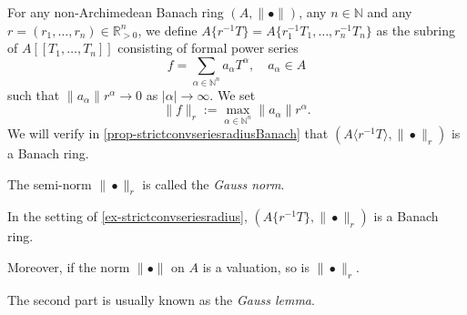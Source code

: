 \begin{example}\label{ex-strictconvseriesradius}
    For any non-Archimedean Banach ring $(A,\|\bullet\|)$, any $n\in \mathbb{N}$ and any $r=(r_1,\ldots,r_n)\in \mathbb{R}^n_{>0}$, we define $A\{ r^{-1}T \} =A\{ r_1^{-1}T_1,\ldots, r_n^{-1}T_n \}$ as the subring of $A[[T_1,\ldots,T_n]]$ consisting of formal power series
    \[
      f=\sum_{\alpha\in \mathbb{N}^{n}} a_{\alpha}T^{\alpha},\quad a_{\alpha}\in A  
    \]
    such that $\|a_{\alpha}\|r^{\alpha}\to 0$ as $|\alpha|\to\infty$. We set
    \[
        \|f\|_r:=   \max_{\alpha\in \mathbb{N}^{n}} \|a_{\alpha}\|r^{\alpha}.
    \]
    We will verify in \cref{prop-strictconvseriesradiusBanach} that $(A\langle r^{-1}T \rangle ,\|\bullet\|_r)$ is a Banach ring.

    The semi-norm $\|\bullet\|_r$ is called the \emph{Gauss norm}. 
\end{example}

\begin{proposition}\label{prop-strictconvseriesradiusBanach}
    In the setting of \cref{ex-strictconvseriesradius}, $(A\{ r^{-1}T \}  ,\|\bullet\|_r)$ is a Banach ring.

    Moreover, if the norm $\|\bullet\|$ on $A$ is a valuation, so is $\|\bullet\|_r$.
\end{proposition}
The second part is usually known as the \emph{Gauss lemma}.

